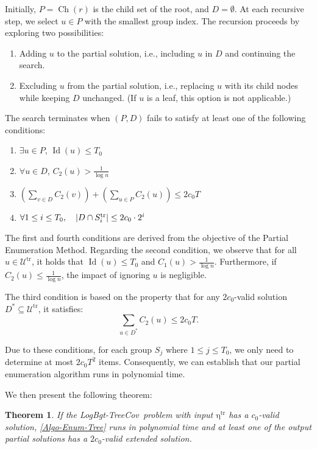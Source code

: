 \documentclass[11pt,a4paper]{article} \usepackage{enumitem}
\newcommand{\calU}{\mathcal{U}}
\newcommand{\LBOtreecov}{\textsf{LogBgt-TreeCov}}
\newcommand{\trU}{\operatorname{\calU^{tr}}}
\newcommand{\trS}[1]{\ifx\relax#1\relax
    S^{\operatorname{tr}} \else
    S^{\operatorname{tr}}_{#1} \fi
}
\newcommand{\treta}{\operatorname{\eta^{tr}}}
\newcommand{\Ch}{\operatorname{Ch}}
\newcommand{\Lev}{\operatorname{Id}}
\newtheorem{theorem}{Theorem}[section]
\theoremstyle{definition}
\begin{document}
Initially, $P=\Ch(r)$ is the child set of the root, and $D=\emptyset$. 
At each recursive step, we select \( u\in P \) with the smallest group index. The recursion proceeds by exploring two possibilities:
\begin{enumerate}
    \item Adding \( u \) to the partial solution, i.e., including \( u \) in \( D \) and continuing the search.
    \item Excluding \( u \) from the partial solution, i.e., replacing \( u \) with its child nodes while keeping \( D \) unchanged. (If \( u \) is a leaf, this option is not applicable.)
\end{enumerate}

The search terminates when \( (P, D) \) fails to satisfy at least one of the following conditions:
\begin{enumerate}
\item $\exists u\in P$, $\Lev(u)\le T_0$
\item $\forall u\in D$, $C_2(u) > \frac{1}{\log n}$
\item \( \left(\sum_{v \in D} C_2(v)\right) + \left(\sum_{u \in P} C_2(u)\right) \le 2c_0 T \)
\item \( \forall 1\le i \leq T_0, \quad |D \cap \trS{i}| \le 2c_0 \cdot 2^i \)
\end{enumerate}
The first and fourth conditions are derived from the objective of the Partial Enumeration Method. Regarding the second condition, we observe that for all \( u \in \trU \), it holds that \( \Lev(u) \leq T_0 \) and \( C_1(u) > \frac{1}{\log n} \). Furthermore, if \( C_2(u) \leq \frac{1}{\log n} \), the impact of ignoring \( u \) is negligible.

The third condition is based on the property that for any \( 2c_0 \)-valid solution \( D^{*} \subseteq \trU \), it satisfies:
\[
\sum_{u\in D^{*}} C_2(u) \leq 2c_0 T.
\]

Due to these conditions, for each group \( S_j \) where \( 1\le j\le T_0 \), we only need to determine at most \( 2c_0T^2 \) items. Consequently, we can establish that our partial enumeration algorithm runs in polynomial time.

We then present the following theorem:
\color{black}


\begin{theorem}\label{thm:tree-Enum}
If the \LBOtreecov\ problem with input $\treta$ has a $c_0$-valid solution, \cref{Algo-Enum-Tree} runs
in polynomial time and at least one of the output partial solutions has a $2c_0$-valid extended solution.
\end{theorem}
\end{document}
